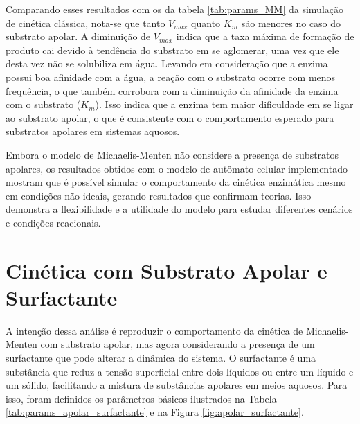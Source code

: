 \documentclass[12pt,oneside]{report}
\begin{document}
Comparando esses resultados com os da tabela \ref{tab:params_MM} da simulação de cinética clássica, nota-se que tanto $V_{max}$ quanto $K_m$ são menores no caso do substrato apolar. A diminuição de $V_{max}$ indica que a taxa máxima de formação de produto cai devido à tendência do substrato em se aglomerar, uma vez que ele desta vez não se solubiliza em água. Levando em consideração que a enzima possui boa afinidade com a água, a reação com o substrato ocorre com menos frequência, o que também corrobora com a diminuição da afinidade da enzima com o substrato ($K_m$). Isso indica que a enzima tem maior dificuldade em se ligar ao substrato apolar, o que é consistente com o comportamento esperado para substratos apolares em sistemas aquosos.

Embora o modelo de Michaelis-Menten não considere a presença de substratos apolares, os resultados obtidos com o modelo de autômato celular implementado mostram que é possível simular o comportamento da cinética enzimática mesmo em condições não ideais, gerando resultados que confirmam teorias. Isso demonstra a flexibilidade e a utilidade do modelo para estudar diferentes cenários e condições reacionais.

\section{Cinética com Substrato Apolar e Surfactante}

A intenção dessa análise é reproduzir o comportamento da cinética de Michaelis-Menten com substrato apolar, mas agora considerando a presença de um surfactante que pode alterar a dinâmica do sistema. O surfactante é uma substância que reduz a tensão superficial entre dois líquidos ou entre um líquido e um sólido, facilitando a mistura de substâncias apolares em meios aquosos. Para isso, foram definidos os parâmetros básicos ilustrados na Tabela \ref{tab:params_apolar_surfactante} e na Figura \ref{fig:apolar_surfactante}.
\end{document}
